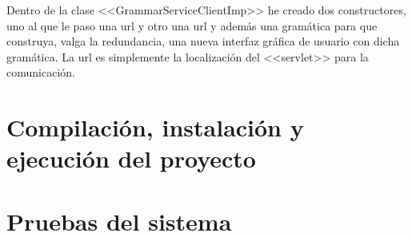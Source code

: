 Dentro de la clase <<GrammarServiceClientImp>> he creado dos constructores, uno al que le paso una url y otro una url y además una gramática para que construya, valga la redundancia, una nueva interfaz gráfica de usuario con dicha gramática. La url es simplemente la localización del <<servlet>> para la comunicación.


\section{Compilación, instalación y ejecución del proyecto}

\section{Pruebas del sistema}
